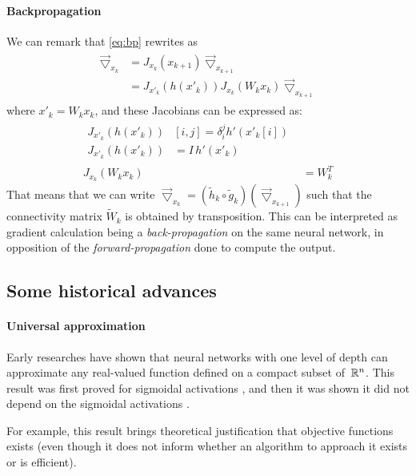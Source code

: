 \paragraph{Backpropagation}
We can remark that \eqref{eq:bp} rewrites as
\begin{align}
  \begin{split}
  \vec{\bigtriangledown}_{x_k} & = J_{x_k}(x_{k+1}) \vec{\bigtriangledown}_{x_{k+1}} \\ 
                               & = J_{x'_k}(h(x'_k)) J_{x_k}(W_k x_k) \vec{\bigtriangledown}_{x_{k+1}}
  \end{split}
\end{align}
where $x'_k = W_k x_k$, and these Jacobians can be expressed as:
\begin{align}
  \begin{split}
  J_{x'_k}(h(x'_k)) & [i,j] = \delta_i^j h'(x'_k[i])\\
  J_{x'_k}(h(x'_k)) & = I \hspace{2pt} h'(x'_k)
  \end{split}\\
  J_{x_k}(W_k x_k) & = W_k^T
\end{align}
That means that we can write $\vec{\bigtriangledown}_{x_k} = (\widetilde{h}_k \circ \widetilde{g}_k)(\vec{\bigtriangledown}_{x_{k+1}})$ such that the connectivity matrix $\widetilde{W}_k$ is obtained by transposition. This can be interpreted as gradient calculation being a \emph{back-propagation} on the same neural network, in opposition of the \emph{forward-propagation} done to compute the output.

\subsection{Some historical advances}
\label{sec:hist}

\paragraph{Universal approximation}
Early researches have shown that neural networks with one level of depth can approximate any real-valued function defined on a compact subset of~$\mathbb{R}^n$. This result was first proved for sigmoidal activations \citep{cybenko1989approximation}, and then it was shown it did not depend on the sigmoidal activations \citep{hornik1989multilayer,hornik1991approximation}.

For example, this result brings theoretical justification that objective functions exists (even though it does not inform whether an algorithm to approach it exists or is efficient).

